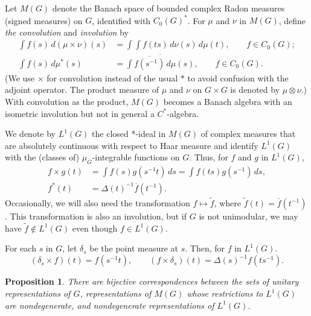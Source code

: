 \documentclass{book}
\newtheorem{proposition}[definition]{Proposition}
\def\cstar{\(C^*\)-algebra}
\begin{document}
Let \(M(G)\) denote the Banach space of bounded complex Radon measures (signed measures) on \(G\), identified with \(C_0(G)^*\).
For \(\mu\) and \(\nu\) in \(M(G)\), define \textit{the convolution} and \textit{involution} by
\begin{align*}
  \int f(s)\,d(\mu\times \nu)(s)&=\int\int f(ts)\,d\nu(s)\,d\mu(t),\qquad f\in C_0(G);\\
  \int f(s)\,d\mu^*(s)&=\overline{\int\overline{f(s^{-1})}\,d\mu(s)},\qquad f\in C_0(G).
\end{align*}
(We use \(\times\) for convolution instead of the usual \(*\) to avoid confusion with the adjoint operator.
The product measure of \(\mu\) and \(\nu\) on \(G\times G\) is denoted by \(\mu\otimes\nu\).) 
With convolution as the product, \(M(G)\) becomes a Banach algebra with an isometric involution but not in general a \cstar.\par
We denote by \(L^1(G)\) the closed *-ideal in \(M(G)\) of complex measures that are absolutely continuous 
with respect to Haar measure and identify \(L^1(G)\) with the (classes of) \(\mu_G\)-integrable functions on \(G\). Thus, for \(f\) and \(g\) in \(L^1(G)\),
\begin{align*}
  f\times g(t)&=\int f(s)g(s^{-1}t)\,ds=\int f(ts)g(s^{-1})\,ds,\\
  f^*(t)&=\Delta(t)^{-1}\overline{f}(t^{-1}).
\end{align*}
Occasionally, we will also need the transformation \(f\mapsto\tilde{f}\), where 
\(\tilde{f}(t)=\overline{f}(t^{-1})\). This transformation is also an involution, but if \(G\) is not unimodular, we may have \(\tilde{f}\notin L^1(G)\) even though \(f\in L^1(G)\).\par
For each \(s\) in \(G\), let \(\delta_s\) be the point measure at \(s\). Then, for \(f\) in \(L^1(G)\).
\[
  (\delta_s\times f)(t)=f(s^{-1}t),\qquad (f\times \delta_s)(t)=\Delta(s)^{-1}f(t s^{-1}).
\]
\begin{proposition}\label{Petersen:714}
  There are bijective correspondences between the sets of unitary representations of \(G\),
  representations of \(M(G)\) whose restrictions to \(L^1(G)\) are nondegenerate, and nondegenerate representations of \(L^1(G)\).
\end{proposition}
\end{document}
